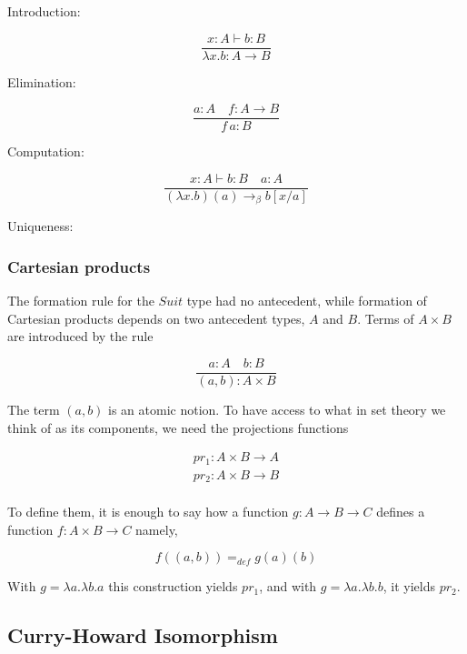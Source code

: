 Introduction:

\begin{equation}
\frac{x :  A \vdash b : B}{ \lambda x. b : A \to B}
\end{equation}

Elimination:

\begin{equation}
\frac{a : A \quad f : A \to B }{ f \,a : B}
\end{equation}

Computation:

\begin{equation}
\frac{x :  A \vdash b : B \quad a: A }{(\lambda x. b)(a) \to_\beta b[x/a]}
\end{equation}


Uniqueness:


\subsubsection{Cartesian products}

The formation rule for the $Suit$ type had no antecedent, while formation of  Cartesian products depends on two antecedent types, $A$  and $B$. Terms of $A\times B$ are introduced by the rule

\begin{equation}
\frac{a : A \quad b : B}{(a,b) : A \times B}
\end{equation}

The term $(a,b)$ is an atomic notion. To have access to what in set theory we think of as its components, we need the projections functions

\begin{align}
pr_1 : A \times B \to A \\
pr_2 : A \times B \to B \\
\end{align}

To define them, it is enough to say how a function $g : A \to B \to C$ defines a function $f: A\times B \to C$ namely,

\begin{equation}
f((a,b)) =_{def} g(a)(b)
\end{equation}


With $g =\lambda a.\lambda b . a$ this construction yields $pr_1$, and with
$g =\lambda a.\lambda b . b$, it yields $pr_2$.





\subsection{Curry-Howard Isomorphism}

